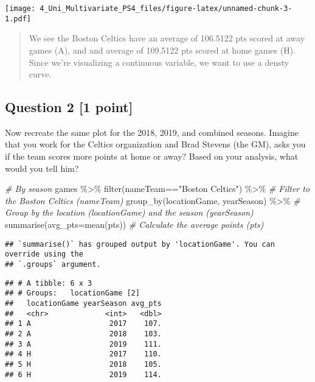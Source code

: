 \documentclass[
]{article}
\newenvironment{Shaded}{\begin{snugshade}}{\end{snugshade}}
\newcommand{\AttributeTok}[1]{\textcolor[rgb]{0.77,0.63,0.00}{#1}}
\newcommand{\CommentTok}[1]{\textcolor[rgb]{0.56,0.35,0.01}{\textit{#1}}}
\newcommand{\FunctionTok}[1]{\textcolor[rgb]{0.00,0.00,0.00}{#1}}
\newcommand{\NormalTok}[1]{#1}
\newcommand{\SpecialCharTok}[1]{\textcolor[rgb]{0.00,0.00,0.00}{#1}}
\newcommand{\StringTok}[1]{\textcolor[rgb]{0.31,0.60,0.02}{#1}}
\begin{document}
\texttt{[image: 4\_Uni\_Multivariate\_PS4\_files/figure-latex/unnamed-chunk-3-1.pdf]}

\begin{quote}
We see the Boston Celtics have an average of 106.5122 pts scored at away
games (A), and and average of 109.5122 pts scored at home games (H).
Since we're visualizing a continuous variable, we want to use a densty
curve.
\end{quote}

\hypertarget{question-2-1-point}{%
\subsection{Question 2 {[}1 point{]}}\label{question-2-1-point}}

Now recreate the same plot for the 2018, 2019, and combined seasons.
Imagine that you work for the Celtics organization and Brad Stevens (the
GM), asks you if the team scores more points at home or away? Based on
your analysis, what would you tell him?

\begin{Shaded}
\begin{Highlighting}[]
\CommentTok{\# By season}
\NormalTok{games }\SpecialCharTok{\%\textgreater{}\%}
  \FunctionTok{filter}\NormalTok{(nameTeam}\SpecialCharTok{==}\StringTok{"Boston Celtics"}\NormalTok{) }\SpecialCharTok{\%\textgreater{}\%} \CommentTok{\# Filter to the Boston Celtics (nameTeam)}
  \FunctionTok{group\_by}\NormalTok{(locationGame, yearSeason) }\SpecialCharTok{\%\textgreater{}\%} \CommentTok{\# Group by the location (locationGame) and the season (yearSeason)}
  \FunctionTok{summarise}\NormalTok{(}\AttributeTok{avg\_pts=}\FunctionTok{mean}\NormalTok{(pts)) }\CommentTok{\# Calculate the average points (pts)}
\end{Highlighting}
\end{Shaded}

\begin{verbatim}
## `summarise()` has grouped output by 'locationGame'. You can override using the
## `.groups` argument.
\end{verbatim}

\begin{verbatim}
## # A tibble: 6 x 3
## # Groups:   locationGame [2]
##   locationGame yearSeason avg_pts
##   <chr>             <int>   <dbl>
## 1 A                  2017    107.
## 2 A                  2018    103.
## 3 A                  2019    111.
## 4 H                  2017    110.
## 5 H                  2018    105.
## 6 H                  2019    114.
\end{verbatim}
\end{document}
